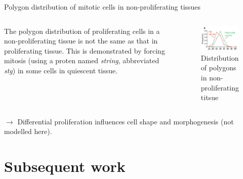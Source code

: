 \documentclass[aspectratio=169, 10pt]{beamer}
\begin{document}
\begin{frame}[fragile]{Polygon distribution of mitotic cells in non-proliferating tissues}
  \begin{columns}[onlytextwidth]
    The polygon distribution of proliferating cells in a non-proliferating tissue is not the same as that in proliferating tissue. This is demonstrated by forcing mitosis (using a proten named \emph{string}, abbreviated \emph{stg}) in some cells in quiescent tissue.
    \begin{figure}
      \centering
      \includegraphics[width=\textwidth]{figures/fig3e.png}
      \caption{Distribution of polygons in non-proliferating titsue}
    \end{figure}
  \end{columns}
  $\rightarrow$ Differential proliferation influences cell shape and morphogenesis (not modelled here).
\end{frame}

\section{Subsequent work}
\end{document}
